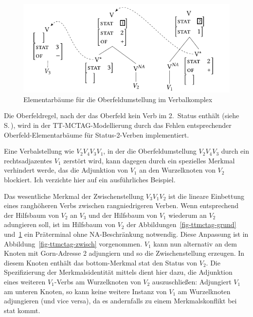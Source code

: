 \begin{figure}[t]
\centering
\includegraphics{graphics/abb711.pdf}
\caption{\label{fig-ttmctag-ober}Elementarbäume für die Oberfeldumstellung im Verbalkomplex}
\end{figure}

Die Oberfeldregel, nach der das Oberfeld kein Verb im 2.~Status enthält (siehe S.\,\pageref{ex-ofr}), wird in der TT-MCTAG-Modellierung durch das Fehlen entsprechender Oberfeld-Elementarbäume für Status-2-Verben implementiert.

Eine Verbalstellung wie $V_2 V_4 V_3 V_1$, in der die Oberfeldumstellung $V_2 V_4 V_3$ durch ein rechtsadjazentes $V_1$ zerstört wird, kann dagegen durch ein spezielles Merkmal verhindert werde, das die Adjunktion von $V_1$ an den Wurzelknoten von $V_2$ blockiert. Ich verzichte hier auf ein ausführliches Beispiel.


\largerpage[-1]
Das wesentliche Merkmal der Zwischenstellung $V_3 V_1 V_2$ ist die lineare Einbettung eines ranghöheren Verbs zwischen rangniedrigeren Verben. Wenn entsprechend der Hilfsbaum von $V_2$ an $V_3$ und der Hilfsbaum von $V_1$ wiederum an $V_2$ adungieren soll, ist im Hilfsbaum von $V_2$ der Abbildungen~\ref{fig-ttmctag-grund} und~\ref{fig-ttmctag-ober} ein Präterminal ohne NA-Beschränkung notwendig. Diese Anpassung ist in Abbildung~\ref{fig-ttmctag-zwisch} vorgenommen. $V_1$ kann nun alternativ an dem Knoten mit Gorn-Adresse 2 adjungiern und so die Zwischenstellung erzeugen. In diesem Knoten enthält das {\sc bottom}-Merkmal {\sc stat} den Status von $V_2$. Die Spezifizierung der Merkmalsidentität mittels  dient hier dazu, die Adjunktion eines weiteren $V_1$-Verbs am Wurzelknoten von $V_2$ auszuschlie\ss en: Adjungiert $V_1$ am unteren Knoten, so kann keine weitere Instanz von $V_1$ am Wurzelknoten adjungieren (und vice versa), da es andernfalls zu einem Merkmalskonflikt bei {\sc stat} kommt.          


